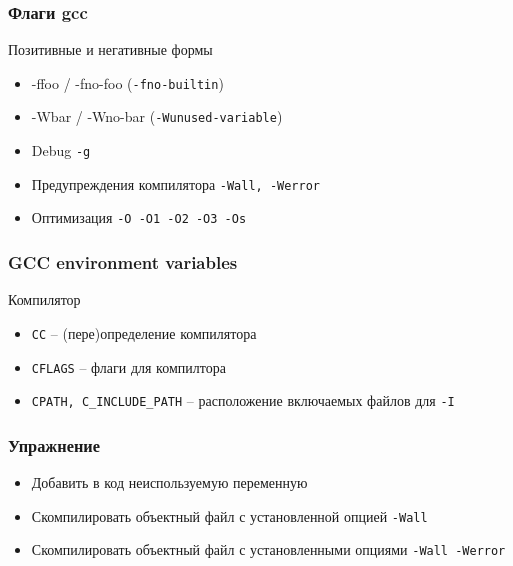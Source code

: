 \begin{frame}
\frametitle{Флаги gcc}

	\begin{block}{Позитивные и негативные формы}
		\begin{itemize}
			\item -ffoo / -fno-foo ({\tt -fno-builtin})
			\item -Wbar / -Wno-bar ({\tt -Wunused-variable})
		\end{itemize}
	\end{block}


	\begin{itemize}
	  \item Debug {\tt -g}
	  \item Предупреждения компилятора {\tt -Wall, -Werror}
	  \item Оптимизация {\tt -O -O1 -O2 -O3 -Os}
	\end{itemize}
\end{frame}

\begin{frame}[fragile]
	\frametitle{GCC environment variables}

	\begin{block}{Компилятор}
		\begin{itemize}
			\item {\tt CC} -- (пере)определение компилятора
			\item {\tt CFLAGS} -- флаги для компилтора
			\item {\tt CPATH, C\_INCLUDE\_PATH} -- расположение включаемых файлов для {\tt -I}
		\end{itemize}
	\end{block}
\end{frame}

\begin{frame}
	\frametitle{Упражнение}
	\begin{itemize}
		\item Добавить в код неиспользуемую переменную
		\item Скомпилировать объектный файл с установленной опцией {\tt -Wall}
		\item Скомпилировать объектный файл с установленными опциями {\tt -Wall -Werror}
	\end{itemize}
\end{frame}


